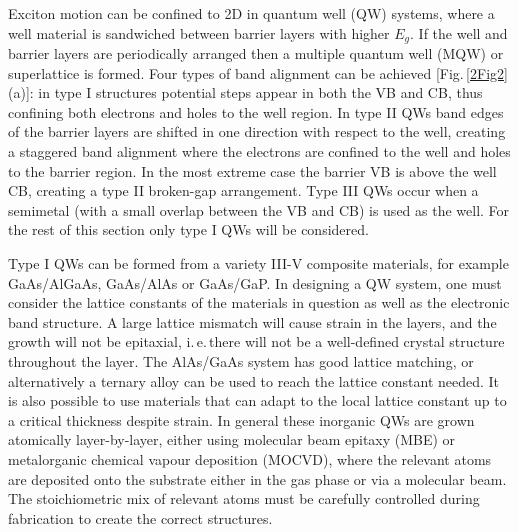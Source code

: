 Exciton motion can be confined to 2D in quantum well (QW) systems, where a well material is sandwiched between barrier layers with higher $E_g$. If the well and barrier layers are periodically arranged then a multiple quantum well (MQW) or superlattice is formed. Four types of band alignment can be achieved [Fig.\,\ref{2Fig2}(a)]: in type I structures potential steps appear in both the VB and CB, thus confining both electrons and holes to the well region. In type II QWs band edges of the barrier layers are shifted in one direction with respect to the well, creating a staggered band alignment where the electrons are confined to the well and holes to the barrier region. In the most extreme case the barrier VB is above the well CB, creating a type II broken-gap arrangement. Type III QWs occur when a semimetal (with a small overlap between the VB and CB) is used as the well. For the rest of this section only type I QWs will be considered.

Type I QWs can be formed from a variety III-V composite materials, for example GaAs/AlGaAs, GaAs/AlAs or GaAs/GaP. In designing a QW system, one must consider the lattice constants of the materials in question as well as the electronic band structure. A large lattice mismatch will cause strain in the layers, and the growth will not be epitaxial, i.\,e.\,there will not be a well-defined crystal structure throughout the layer. The AlAs/GaAs system has good lattice matching, or alternatively a ternary alloy can be used to reach the lattice constant needed. It is also possible to use materials that can adapt to the local lattice constant up to a critical thickness despite strain. In general these inorganic QWs are grown atomically layer-by-layer, either using molecular beam epitaxy (MBE) or metalorganic chemical vapour deposition (MOCVD), where the relevant atoms are deposited onto the substrate either in the gas phase or via a molecular beam. The stoichiometric mix of relevant atoms must be carefully controlled during fabrication to create the correct structures. 

